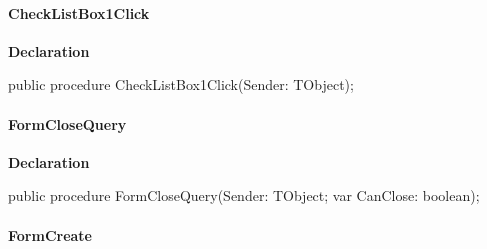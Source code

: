 \documentclass{report}
\newif\ifpdf
\begin{document}
\paragraph*{CheckListBox1Click}\hspace*{\fill}

\label{mnupdate.TForm1-CheckListBox1Click}
\begin{list}{}{
\setlength{\itemindent}{0cm}
\setlength{\listparindent}{0cm}
\setlength{\leftmargin}{\evensidemargin}
\addtolength{\leftmargin}{\tmplength}
\settowidth{\labelsep}{X}
\addtolength{\leftmargin}{\labelsep}
\setlength{\labelwidth}{\tmplength}
}
\item[\textbf{Declaration}\hfill]
\ifpdf
\begin{flushleft}
\fi
\begin{ttfamily}
public procedure CheckListBox1Click(Sender: TObject);\end{ttfamily}

\ifpdf
\end{flushleft}
\fi

\end{list}
\paragraph*{FormCloseQuery}\hspace*{\fill}

\label{mnupdate.TForm1-FormCloseQuery}
\begin{list}{}{
\setlength{\itemindent}{0cm}
\setlength{\listparindent}{0cm}
\setlength{\leftmargin}{\evensidemargin}
\addtolength{\leftmargin}{\tmplength}
\settowidth{\labelsep}{X}
\addtolength{\leftmargin}{\labelsep}
\setlength{\labelwidth}{\tmplength}
}
\item[\textbf{Declaration}\hfill]
\ifpdf
\begin{flushleft}
\fi
\begin{ttfamily}
public procedure FormCloseQuery(Sender: TObject; var CanClose: boolean);\end{ttfamily}

\ifpdf
\end{flushleft}
\fi

\end{list}
\paragraph*{FormCreate}\hspace*{\fill}
\end{document}

